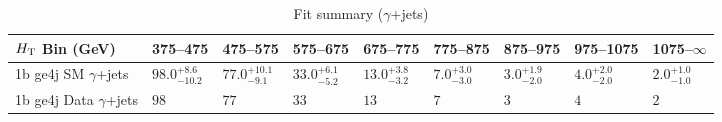 \documentclass[8pt]{article}
\def\scalht{\mbox{$H_{\rm{T}}$}\xspace}
\newcommand\T{\rule{0pt}{2.6ex}}
\begin{document}
\begin{table}[ht!]
\caption{Fit summary ($\gamma$+jets)}
\label{tab:ensemble-summary}
\centering
\begin{tabular}{ lllllllll }

\hline
\scalht Bin (GeV)       & 375--475                       & 475--575                       & 575--675                       & 675--775                       & 775--875                       & 875--975                       & 975--1075                      & 1075--$\infty$                 \\ [1.000000ex]
\hline
1b ge4j SM $\gamma$+jets\T & $98.0^{+8.6}_{-10.2}$          & $77.0^{+10.1}_{-9.1}$          & $33.0^{+6.1}_{-5.2}$           & $13.0^{+3.8}_{-3.2}$           & $7.0^{+3.0}_{-3.0}$            & $3.0^{+1.9}_{-2.0}$            & $4.0^{+2.0}_{-2.0}$            & $2.0^{+1.0}_{-1.0}$            \\ 
1b ge4j Data $\gamma$+jets\T & $98$                           & $77$                           & $33$                           & $13$                           & $7$                            & $3$                            & $4$                            & $2$                            \\ 
\hline

\end{tabular}
\end{table}
\end{document}
